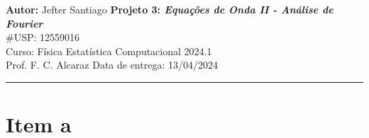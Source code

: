 \documentclass[a4paper, 11pt]{article}
\begin{document}
\noindent
\large\textbf{Autor:} Jefter Santiago \hfill \textbf{Projeto 3: {\color{blue}\emph{Equações de Onda
      II - Análise de Fourier}}}   \\
\#USP: 12559016 \\
\normalsize Curso: Física Estatística Computacional \hfill 2024.1 \\
Prof. F. C. Alcaraz \hfill Data de entrega: 13/04/2024\\
\noindent\rule{7in}{2.8pt}



\section{Item a}
\end{document}
